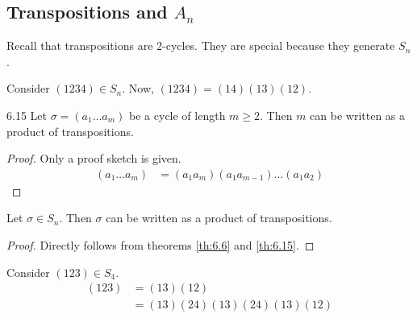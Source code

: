 \documentclass[12pt]{article}
\begin{document}
	\subsection{Transpositions and $A_n$}
	\begin{myrem}{}{}
		Recall that transpositions are 2-cycles. They are special because they generate $S_n$.
	\end{myrem}
	
	\begin{myex}{}{}
		Consider $(1234)\in S_n$. Now, $(1234)=(14)(13)(12)$.
	\end{myex}
	
	\begin{mythm}{}{6.15}
		Let $\sigma=(a_1\dots a_m)$ be a cycle of length $m\geq2$. Then $m$ can be written as a product of transpositions.
		\begin{proof}
		Only a proof sketch is given.
			\begin{align*}
				(a_1\dots a_m)&=(a_1a_m)(a_1a_{m-1})\dots(a_1a_2)
			\end{align*}
		\end{proof}
	\end{mythm}
	
	\begin{mycor}{}{}
		Let $\sigma\in S_n$. Then $\sigma$ can be written as a product of transpositions.
		\begin{proof}
			Directly follows from theorems \ref{th:6.6} and \ref{th:6.15}.
		\end{proof}
	\end{mycor}
	
	\begin{myex}{}{}
		Consider $(123)\in S_4$.
		\begin{align*}
			(123)&=(13)(12)\\
			&=(13)(24)(13)(24)(13)(12)
		\end{align*}
	\end{myex}
	
\end{document}
